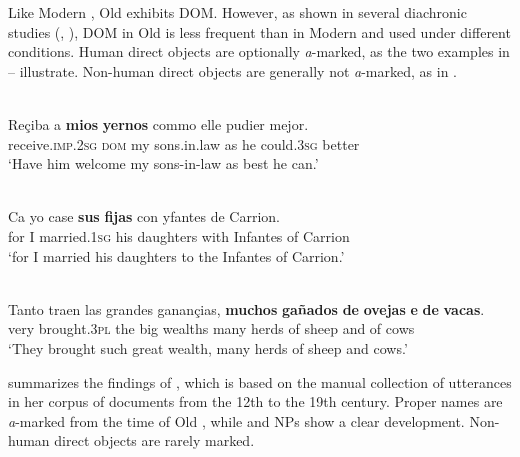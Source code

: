 \documentclass[output=paper]{LSP/langsci}
\begin{document}
Like Modern , Old  exhibits DOM. However, as shown in several diachronic studies (\citealt{Melis1995Objetodirecto}, \citealt{Laca2006Objeto}), DOM in Old  is less frequent than in Modern  and used under different conditions. Human  direct objects are optionally \textit{a}-marked, as the two examples in -- illustrate. Non-human   direct objects are generally not \textit{a}-marked, as in .

\ea {}\\
\label{11-he-ex:22}
\gll Reçiba a \textbf{mios} \textbf{yernos} commo elle pudier mejor.\\ %
receive.\textsc{imp}.\textsc{2sg} \textsc{dom} my sons.in.law as he could.\textsc{3sg} better\\
\glt ‘Have him welcome my sons-in-law as best he can.’ 
\z

\ea {}\\
\label{11-he-ex:23}
\gll Ca yo case \textbf{sus} \textbf{fijas} con yfantes de Carrion.\\ %
for I married.\textsc{1sg} his daughters with Infantes of Carrion\\
\glt ‘for I married his daughters to the Infantes of Carrion.’
\z

\ea \label{11-he-ex:24}
\\
\gll Tanto traen las grandes ganançias, \textbf{muchos} \textbf{gañados} \textbf{de} \textbf{ovejas} \textbf{e} \textbf{de} \textbf{vacas}.\\
very brought.\textsc{3pl} the big wealths many herds of sheep and of cows\\
\glt ‘They brought such great wealth, many herds of sheep and cows.’  %
\z

 summarizes the findings of \citet{Laca2006Objeto}, which is based on the manual collection of utterances in her corpus of documents from the 12th to the 19th century. Proper names are \textit{a}-marked from the time of Old , while  and  NPs show a clear development. Non-human direct objects are rarely marked.
\end{document}

